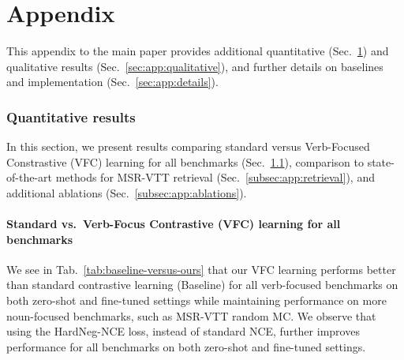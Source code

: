 


\def\OURS{VFC\xspace}
\vspace{-1cm}
\maketitle
\vspace{-1cm}
\appendix

\part{Appendix} {\hypersetup{linkcolor=black} \parttoc}



\clearpage
\ificcvfinal\thispagestyle{empty}\fi

\renewcommand{\thefigure}{A.\arabic{figure}}
\setcounter{figure}{0} 
\renewcommand{\thetable}{A.\arabic{table}}
\setcounter{table}{0} 



This appendix to the main paper provides additional quantitative 
(Sec.~\ref{sec:app:exp})
and qualitative results
(Sec.~\ref{sec:app:qualitative}),
and further details on baselines and implementation
(Sec.~\ref{sec:app:details}).

\section{Quantitative results}\label{sec:app:exp}

In this section, we present results comparing standard versus Verb-Focused Constrastive (VFC) learning for all benchmarks (Sec.~\ref{subsec:app:base_vs_vfc}), comparison to state-of-the-art methods for MSR-VTT retrieval (Sec.~\ref{subsec:app:retrieval}), and additional ablations (Sec.~\ref{subsec:app:ablations}). 


\subsection{Standard vs.~Verb-Focus Contrastive (VFC) learning for all benchmarks}\label{subsec:app:base_vs_vfc}
We see in Tab.~\ref{tab:baseline-versus-ours} that our VFC learning performs better than standard contrastive learning (Baseline) for all verb-focused benchmarks on both zero-shot and fine-tuned settings while maintaining performance on more noun-focused benchmarks, such as MSR-VTT random MC. We observe that using the HardNeg-NCE loss, instead of standard NCE, further improves performance for all benchmarks on both zero-shot and fine-tuned settings.




